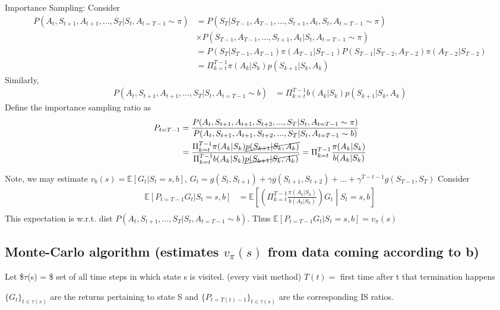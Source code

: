 \documentclass[11pt]{article}
\begin{document}
Importance Sampling:
Consider
\begin{align*}
P(A_t, S_{t+1}, A_{t+1}, ..., S_T | S_t, A_{t=T-1} \sim \pi) &=
 P(S_T | S_{T-1}, A_{T-1}, ..., S_{t+1}, A_t, S_t, A_{t=T-1} \sim \pi) \\
&\times P(S_{T-1}, A_{T-1}, ..., S_{t+1}, A_t | S_t, A_{t=T-1} \sim \pi) \\
&= P(S_T | S_{T-1}, A_{T-1}) \pi(A_{T-1} | S_{T-1}) P(S_{T-1} | S_{T-2}, A_{T-2}) \pi(A_{T-2} | S_{T-2}) \\
&= \Pi_{k=t}^{T-1} \pi(A_k | S_k) p(S_{k+1} | S_k, A_k)
\end{align*}
Similarly,
\begin{align*}
P(A_t, S_{t+1}, A_{t+1}, ..., S_T | S_t, A_{t=T-1} \sim b) &= \Pi_{k=t}^{T-1} b(A_k | S_k) p(S_{k+1} | S_k, A_k)
\end{align*}
Define the importance sampling ratio as
\begin{align*}
P_{t=T-1} &= \frac{P(A_t, S_{t+1}, A_{t+1}, S_{t+2}, ..., S_T | S_t, A_{t=T-1} \sim \pi)}{P(A_t, S_{t+1}, A_{t+1}, S_{t+2}, ..., S_T | S_t, A_{t=T-1} \sim b)} \\
          &= \frac{\Pi_{k=t}^{T-1} \pi(A_k | S_k) \cancel{p(S_{k+1} | S_k, A_k)}}{\Pi_{k=t}^{T-1} b(A_k | S_k) \cancel{p(S_{k+1} | S_k, A_k)}}
          = \Pi_{k=t}^{T-1}\frac{\pi(A_k | S_k)}{b(A_k | S_k)}
\end{align*}

Note, we may estimate \(v_b(s) = \mathbb{E}[G_t | S_t = s, b]\), \(G_t = g(S_t, S_{t+1}) + \gamma g(S_{t+1}, S_{t+2}) + ... + \gamma^{T-t-1}g(S_{T-1}, S_T)\)
Consider
\begin{align*}
\mathbb{E}[P_{t=T-1} G_t | S_t = s, b] &= \mathbb{E}\left[\left( \Pi_{k=t}^{T-1} \frac{\pi(A_k|S_k)}{b(A_k|S_k)} \right) G_t \middle| S_t = s, b \right] \\
\end{align*}
This expectation is w.r.t. dist \(P(A_t, S_{t+1}, ..., S_T | S_t, A_{t=T-1} \sim b)\).
Thus \(\mathbb{E}[P_{t=T-1} G_t | S_t = s, b] = v_{\pi}(s)\)

\subsection{Monte-Carlo algorithm (estimates \(v_{\pi}(s)\) from data coming according to b)}
\label{sec:org8208a52}
Let \$\(\tau\)(s) = \$ set of all time steps in which state s is visited. (every visit method)
    \(T(t) =\) first time after t that termination happens

\(\{G_t\}_{t \in \tau(s)}\) are the returns pertaining to state S and \(\{P_{t=T(t) - 1}\}_{t \in \tau(s)}\) are the corresponding IS ratios.
\end{document}
